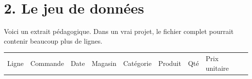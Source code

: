 \documentclass[
  french,
  letterpaper,
  open=any]{scrbook}
\newcounter{none} %
\theoremstyle{definition}
\theoremstyle{definition}
\theoremstyle{remark}
\begin{document}
\section{2. Le jeu de données}\label{le-jeu-de-donnuxe9es}

Voici un extrait pédagogique. Dans un vrai projet, le fichier complet
pourrait contenir beaucoup plus de lignes.

{\def\LTcaptype{none} %
\begin{longtable}[]{@{}
  >{\raggedleft\arraybackslash}p{}
  >{\raggedright\arraybackslash}p{}
  >{\raggedright\arraybackslash}p{}
  >{\raggedright\arraybackslash}p{}
  >{\raggedright\arraybackslash}p{}
  >{\raggedright\arraybackslash}p{}
  >{\raggedleft\arraybackslash}p{}
  >{\raggedleft\arraybackslash}p{}
  >{\raggedleft\arraybackslash}p{}
  >{\raggedright\arraybackslash}p{}@{}}
\toprule\noalign{}
\begin{minipage}[b]{\linewidth}\raggedleft
Ligne
\end{minipage} & \begin{minipage}[b]{\linewidth}\raggedright
Commande
\end{minipage} & \begin{minipage}[b]{\linewidth}\raggedright
Date
\end{minipage} & \begin{minipage}[b]{\linewidth}\raggedright
Magasin
\end{minipage} & \begin{minipage}[b]{\linewidth}\raggedright
Catégorie
\end{minipage} & \begin{minipage}[b]{\linewidth}\raggedright
Produit
\end{minipage} & \begin{minipage}[b]{\linewidth}\raggedleft
Qté
\end{minipage} & \begin{minipage}[b]{\linewidth}\raggedleft
Prix unitaire
\end{minipage} & \begin{minipage}[b]{\linewidth}\raggedleft

\end{minipage}
\end{longtable}}
\end{document}
